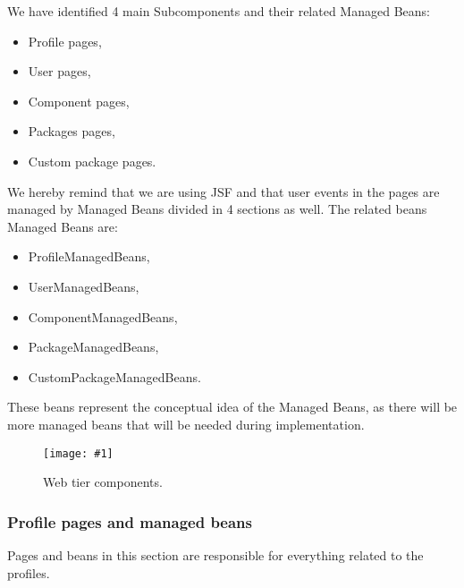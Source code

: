 \documentclass[a4paper,12pt]{book}
\newcommand{\insimg}[3]{
  \begin{figure}[H]
    \begin{center}
      \texttt{[image: \#1]}
    \end{center}
    \caption{#2}
    \label{fig:#1}
  \end{figure}
}
\begin{document}
We have identified 4 main Subcomponents and their related Managed Beans:
\begin{itemize}
  \item Profile pages,
  \item User pages,
  \item Component pages,
  \item Packages pages,
  \item Custom package pages.
\end{itemize}
We hereby remind that we are using JSF and that user events in the pages are managed by Managed Beans divided in 4 sections as well. The related beans Managed Beans are:
\begin{itemize}
  \item ProfileManagedBeans,
  \item UserManagedBeans,
  \item ComponentManagedBeans,
  \item PackageManagedBeans,
  \item CustomPackageManagedBeans.
\end{itemize}

These beans represent the conceptual idea of the Managed Beans, as there will be more managed beans that will be needed during implementation.

\insimg{web-tier}{Web tier components.}{0.5}

\subsubsection{Profile pages and managed beans}
Pages and beans in this section are responsible for everything related to the profiles.
\end{document}
